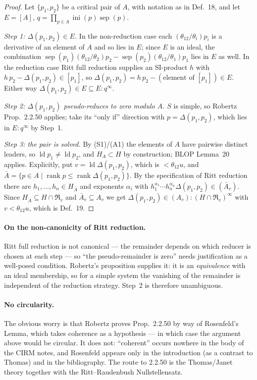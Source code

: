\documentclass[11pt]{article}
\newcommand{\satalg}[2]{(#1)\!:\!#2^{\infty}}
\newcommand{\ld}{\operatorname{ld}}
\newcommand{\sep}{\operatorname{sep}}
\newcommand{\ini}{\operatorname{ini}}
\newcommand{\R}{\mathfrak{R}}
\begin{document}
\begin{proof}
Let $\{p_1,p_2\}$ be a critical pair of $A$, with notation as in Def.~18, and
let $E=[A]$, $q=\prod_{p\in A}\ini(p)\sep(p)$.

\emph{Step 1: $\Delta(p_1,p_2)\in E$.} In the non-reduction case each
$(\theta_{12}/\theta_i)p_i$ is a derivative of an element of $A$ and so lies in
$E$; since $E$ is an ideal, the combination
$\sep(p_1)(\theta_{12}/\theta_2)p_2-\sep(p_2)(\theta_{12}/\theta_1)p_1$ lies in
$E$ as well. In the reduction case Ritt full reduction supplies an SI-product
$h$ with $h\,p_2-\Delta(p_1,p_2)\in[p_1]$, so
$\Delta(p_1,p_2)=h\,p_2-(\text{element of }[p_1])\in E$. Either way
$\Delta(p_1,p_2)\in E\subseteq E:q^\infty$.

\emph{Step 2: $\Delta(p_1,p_2)$ pseudo-reduces to zero modulo $A$.} $S$ is
simple, so Robertz Prop.~2.2.50 applies; take its ``only if'' direction with
$p=\Delta(p_1,p_2)$, which lies in $E:q^\infty$ by Step~1.

\emph{Step 3: the pair is solved.} By (S1)/(A1) the elements of $A$ have
pairwise distinct leaders, so $\ld p_1\ne\ld p_2$, and $H_A\subset H$ by
construction; BLOP Lemma~20 applies. Explicitly, put $v=\ld\Delta(p_1,p_2)$,
which is $<\theta_{12}u$, and $\bar A=\{p\in A\mid \operatorname{rank}p\le
\operatorname{rank}\Delta(p_1,p_2)\}$. By the specification of Ritt reduction
there are $h_1,\dots,h_n\in H_{\bar A}$ and exponents $\alpha_i$ with
$h_1^{\alpha_1}\cdots h_n^{\alpha_n}\Delta(p_1,p_2)\in(\bar A_v)$. Since
$H_{\bar A}\subseteq H\cap\R_v$ and $\bar A_v\subseteq A_v$ we get
$\Delta(p_1,p_2)\in\satalg{A_v}{(H\cap\R_v)}$ with $v<\theta_{12}u$, which is
Def.~19.
\end{proof}

\paragraph{On the non-canonicity of Ritt reduction.} Ritt full reduction is not
canonical --- the remainder depends on which reducer is chosen at each step ---
so ``the pseudo-remainder is zero'' needs justification as a well-posed
condition. Robertz's proposition supplies it: it is an \emph{equivalence} with
an ideal membership, so for a simple system the vanishing of the remainder is
independent of the reduction strategy. Step~2 is therefore unambiguous.

\paragraph{No circularity.} The obvious worry is that Robertz proves Prop.~2.2.50
by way of Rosenfeld's Lemma, which takes coherence as a hypothesis --- in which
case the argument above would be circular. It does not: ``coherent'' occurs
nowhere in the body of the CIRM notes, and Rosenfeld appears only in the
introduction (as a contrast to Thomas) and in the bibliography. The route to
2.2.50 is the Thomas/Janet theory together with the Ritt--Raudenbush
Nullstellensatz.
\end{document}
